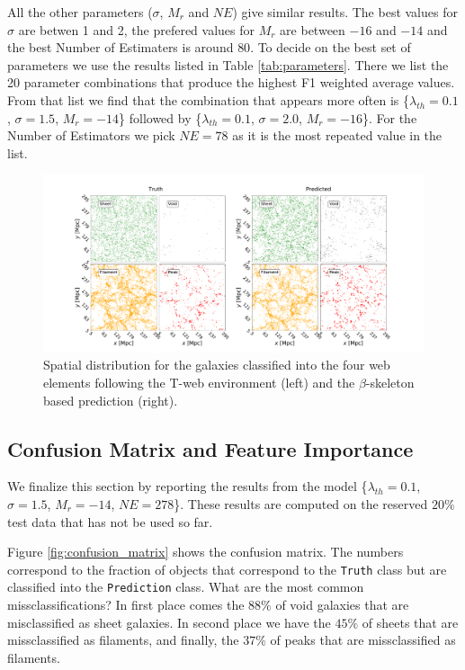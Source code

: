 \documentclass[usenatbib]{mnras}
\begin{document}
All the other parameters ($\sigma$, $M_r$ and $NE$) give similar
results. 
The best values for $\sigma$ are betwen 1 and 2, the prefered values
for $M_r$ are between $-16$ and $-14$ and the best Number of
Estimaters is around $80$.
To decide on the best set of parameters we use the results listed in
Table \ref{tab:parameters}.
There we list the 20 parameter combinations that
produce the highest F1 weighted average values.
From that list we find that the combination that appears more often is 
\{$\lambda_{th}=0.1$, $\sigma=1.5$, $M_r=-14$\} followed by 
\{$\lambda_{th}=0.1$, $\sigma=2.0$, $M_r=-16$\}.
For the Number of Estimators we pick $NE=78$ as it is the most
repeated value in the list.



\begin{figure}
  \centering 
    \includegraphics[scale=0.25]{Figs/p_environment_predicted.pdf}
    \caption{Spatial distribution for the galaxies classified into the
      four web elements following the T-web environment (left) and 
      the $\beta$-skeleton based prediction (right).} 
    \label{fig:prediction}
\end{figure}


\subsection{Confusion Matrix and Feature Importance}

We finalize this section by reporting the results from the model 
\{$\lambda_{th}=0.1$, $\sigma=1.5$, $M_r=-14$, $NE=278$\}.
These results are computed on the reserved $20\%$ test data that has
not be used so far.

Figure \ref{fig:confusion_matrix} shows the confusion matrix.
The numbers correspond to the fraction of objects that correspond to
the \verb"Truth" class but are classified into the \verb"Prediction"
class.
What are the most common missclassifications?
In first place comes the $88\%$ of void galaxies that are misclassified
as sheet galaxies.  
In second place we have the $45\%$ of sheets that are missclassified
as filaments, and finally, the $37\%$ of peaks that are missclassified
as filaments.
\end{document}

